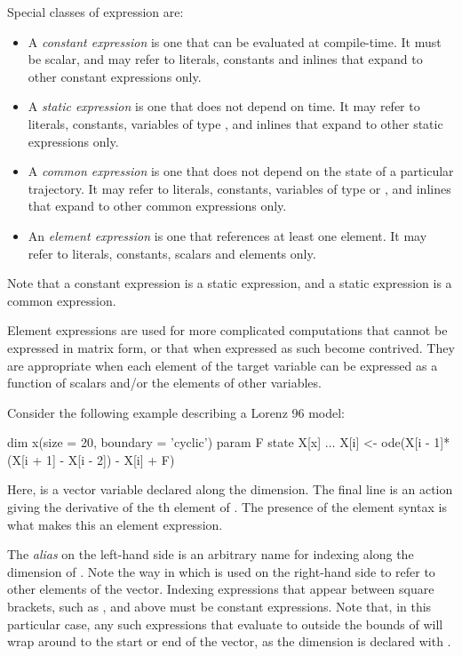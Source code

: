 Special classes of expression are:
\begin{itemize}
\item A \textit{constant expression} is one that
  can be evaluated at compile-time. It must be scalar, and may refer to
  literals, constants and inlines that expand to other constant expressions
  only.
\item A \textit{static expression} is one that does
  not depend on time. It may refer to literals, constants, variables of type
  , and inlines that expand to other static expressions only.
\item A \textit{common expression} is one that does
  not depend on the state of a particular trajectory. It may refer to
  literals, constants, variables of type  or , and
  inlines that expand to other common expressions only.
\item An \textit{element expression} is one that
  references at least one element. It may refer to literals, constants,
  scalars and elements only.
\end{itemize}
Note that a constant expression is a static expression, and a static
expression is a common expression.

Element expressions are used for more complicated computations that cannot be
expressed in matrix form, or that when expressed as such become contrived.
They are appropriate when each element of the target variable can be expressed
as a function of scalars and/or the elements of other variables.

Consider the following example describing a Lorenz 96 model:
\begin{bicode}
dim x(size = 20, boundary = 'cyclic')
param F
state X[x]
\(\ldots\)
X[i] <- ode(X[i - 1]*(X[i + 1] - X[i - 2]) - X[i] + F)
\end{bicode}

Here,  is a vector variable declared along the 
dimension. The final line is an 
action giving the derivative of the th element of . The
presence of the element syntax  is what makes this an element
expression.

The \textit{alias}  on the left-hand side is an arbitrary name for
indexing along the dimension of . Note the way in which 
is used on the right-hand side to refer to other elements of the 
vector. Indexing expressions that appear between square brackets, such as
\bitt{[i + 1]}, \bitt{[i - 2]} and \bitt{[i]} above must be constant
expressions. Note that, in this particular case,
any such expressions that evaluate to outside the bounds of  will
wrap around to the start or end of the vector, as the  dimension is
declared with .


